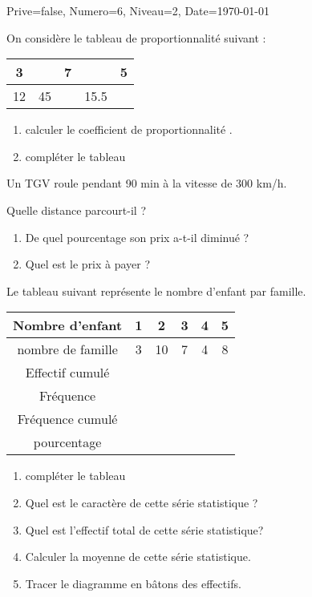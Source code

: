 \documentclass[a4paper,12pt]{article}
\begin{document}
\begin{Maquette}[DM]{Prive=false, Numero=6, Niveau=2, Date=\today}

\begin{exercice}
On considère le tableau de proportionnalité suivant :
\begin{tabular}{|c|c|c|c|c|}
\hline 
3 &  & 7 &  & 5 \\ 
\hline 
12 & 45 &  & 15.5 &  \\ 
\hline 
\end{tabular} 
\begin{enumerate}
\item calculer le coefficient de proportionnalité .
\item compléter le tableau 
\end{enumerate}
\end{exercice}


\begin{exercice}
Un TGV roule pendant 90 min  à la vitesse de 300 km/h.

Quelle distance parcourt-il ?
\end{exercice}

\begin{exercice}
\begin{enumerate}
\item  De quel pourcentage son prix a-t-il diminué ?
\item Quel est le prix à payer ?
\end{enumerate}
\end{exercice}

\begin{exercice}
Le tableau suivant représente le nombre d'enfant par famille.

\begin{tabular}{|c|c|c|c|c|c|}
\hline 
Nombre d'enfant & 1 & 2 & 3 & 4 & 5 \\ 
\hline 
nombre de famille & 3 & 10 & 7 & 4 & 8 \\ 
\hline 
Effectif cumulé  &  &  &  &  &  \\ 
\hline
Fréquence  &  &  &  &  &  \\ 
\hline 
Fréquence cumulé  &  &  &  &  &  \\ 
\hline
pourcentage &  &  &  &  &  \\ 
\hline 
\end{tabular} 
\begin{enumerate}
\item compléter le tableau
\item Quel est le caractère de cette série statistique ?
\item Quel est l'effectif total de cette série statistique?
\item Calculer la moyenne de cette série statistique.
\item Tracer le diagramme en bâtons des effectifs.
\end{enumerate}
\end{exercice}
\end{Maquette}
\end{document}
